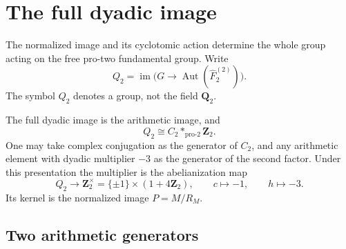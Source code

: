 \section{The full dyadic image}
\label{sec:full-dyadic-image}

The normalized image and its cyclotomic action determine the
whole group acting on the free pro-two fundamental group.
Write
\[
 Q_2=\operatorname{im}\bigl(G\longrightarrow
                 \operatorname{Aut}(\widehat F_2^{(2)})\bigr).
\]
The symbol \(Q_2\) denotes a group, not the field \(\mathbf Q_2\).

\begin{theorem}\label{thm:full-dyadic-free-product}
The full dyadic image is the arithmetic image, and
\[
                  Q_2\cong C_2*_{\mathrm{pro}\text{-}2}\mathbf Z_2.
\]
One may take complex conjugation as the generator of \(C_2\),
and any arithmetic element with dyadic multiplier \(-3\) as
the generator of the second factor.
Under this presentation the multiplier is the abelianization
map
\[
 Q_2\longrightarrow\mathbf Z_2^\times
        =\{\pm1\}\times(1+4\mathbf Z_2),
 \qquad c\longmapsto-1,\qquad h\longmapsto-3.
\]
Its kernel is the normalized image \(P=M/R_M\).
\end{theorem}

\subsection{Two arithmetic generators}

